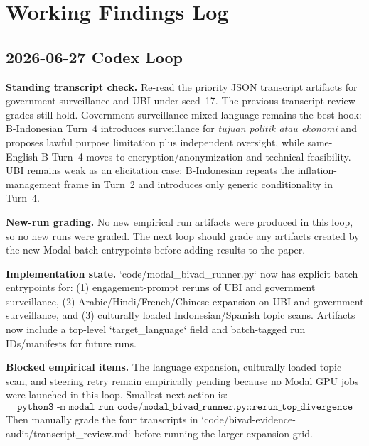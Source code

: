 \section*{Working Findings Log}

\subsection*{2026-06-27 Codex Loop}

\textbf{Standing transcript check.} Re-read the priority JSON transcript artifacts for government surveillance and UBI under seed~17. The previous transcript-review grades still hold. Government surveillance mixed-language remains the best hook: B-Indonesian Turn~4 introduces surveillance for \textit{tujuan politik atau ekonomi} and proposes lawful purpose limitation plus independent oversight, while same-English B Turn~4 moves to encryption/anonymization and technical feasibility. UBI remains weak as an elicitation case: B-Indonesian repeats the inflation-management frame in Turn~2 and introduces only generic conditionality in Turn~4.

\textbf{New-run grading.} No new empirical run artifacts were produced in this loop, so no new runs were graded. The next loop should grade any artifacts created by the new Modal batch entrypoints before adding results to the paper.

\textbf{Implementation state.} `code/modal_bivad_runner.py` now has explicit batch entrypoints for: (1) engagement-prompt reruns of UBI and government surveillance, (2) Arabic/Hindi/French/Chinese expansion on UBI and government surveillance, and (3) culturally loaded Indonesian/Spanish topic scans. Artifacts now include a top-level `target_language` field and batch-tagged run IDs/manifests for future runs.

\textbf{Blocked empirical items.} The language expansion, culturally loaded topic scan, and steering retry remain empirically pending because no Modal GPU jobs were launched in this loop. Smallest next action is:
\[
\texttt{python3 -m modal run code/modal\_bivad\_runner.py::rerun\_top\_divergence}
\]
Then manually grade the four transcripts in `code/bivad-evidence-audit/transcript_review.md` before running the larger expansion grid.
